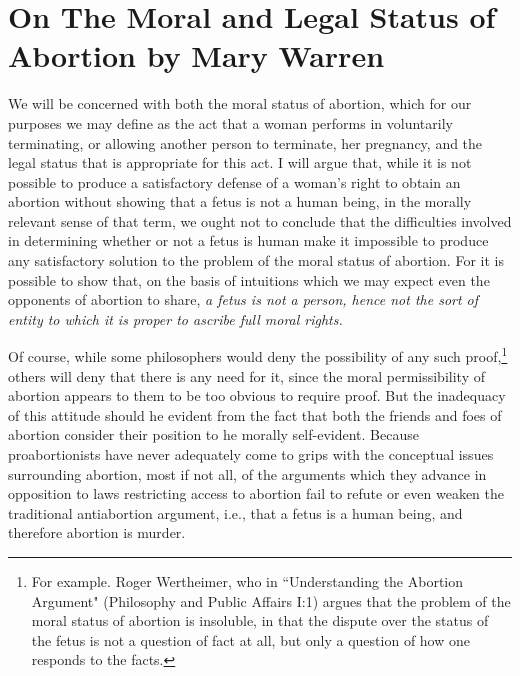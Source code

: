 \chapter{On The Moral and Legal Status of Abortion by Mary Warren}\autocite{Warren1}
\label{statusabortion}
\setcounter{fe}{\thefootnote}
\setcounter{footnote}{0}
We will be concerned with both the moral status of
abortion, which for our purposes we may define as the act
that a woman performs in voluntarily terminating, or
allowing another person to terminate, her pregnancy, and
the legal status that is appropriate for this act. I will argue
that, while it is not possible to produce a satisfactory
defense of a woman’s right to obtain an abortion without
showing that a fetus is not a human being, in the morally
relevant sense of that term, we ought not to conclude that
the difficulties involved in determining whether or not a
fetus is human make it impossible to produce any
satisfactory solution to the problem of the moral status of
abortion. For it is possible to show that, on the basis of
intuitions which we may expect even the opponents of
abortion to share, \emph{a fetus is not a person, hence not the
sort of entity to which it is proper to ascribe full moral
rights.}

Of course, while some philosophers would deny the
possibility of any such proof,\footnote{For example. Roger Wertheimer, who in ``Understanding the
Abortion Argument" (Philosophy and Public Affairs I:1) argues
that the problem of the moral status of abortion is insoluble, in
that the dispute over the status of the fetus is not a question of
fact at all, but only a question of how one responds to the facts.} others will deny that there
is any need for it, since the moral permissibility of
abortion appears to them to be too obvious to require
proof. But the inadequacy of this attitude should he
evident from the fact that both the friends and foes of
abortion consider their position to he morally self-evident.
Because proabortionists have never adequately come to
grips with the conceptual issues surrounding abortion,
most if not all, of the arguments which they advance in
opposition to laws restricting access to abortion fail to
refute or even weaken the traditional antiabortion
argument, i.e., that a fetus is a human being, and therefore
abortion is murder.

